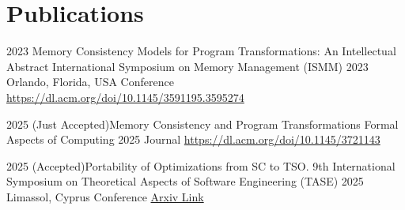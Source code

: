 
\section{Publications}

\cventry
{2023}
{Memory Consistency Models for Program Transformations: An Intellectual Abstract}
{International Symposium on Memory Management (ISMM) 2023}
{Orlando, Florida, USA}
{Conference}
{\url{https://dl.acm.org/doi/10.1145/3591195.3595274}}


\cventry
{2025}
{(Just Accepted)Memory Consistency and Program Transformations}
{Formal Aspects of Computing 2025}
{}
{Journal}
{\url{https://dl.acm.org/doi/10.1145/3721143}}

\cventry
{2025}
{(Accepted)Portability of Optimizations from SC to TSO.}
{9th International Symposium on Theoretical Aspects of Software Engineering (TASE) 2025}
{Limassol, Cyprus}
{Conference}
{\href{https://arxiv.org/abs/2504.17646}{Arxiv Link}}
